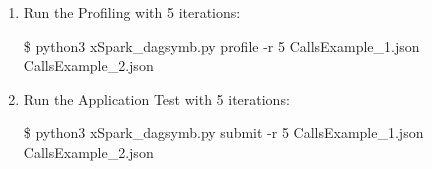 \begin{enumerate}
\item
Run the Profiling with 5 iterations:

\$ python3 xSpark\_dagsymb.py profile -r 5 CallsExample\_1.json CallsExample\_2.json
\item
Run the Application Test with 5 iterations:

\$ python3 xSpark\_dagsymb.py submit  -r 5 CallsExample\_1.json CallsExample\_2.json
\end{enumerate}